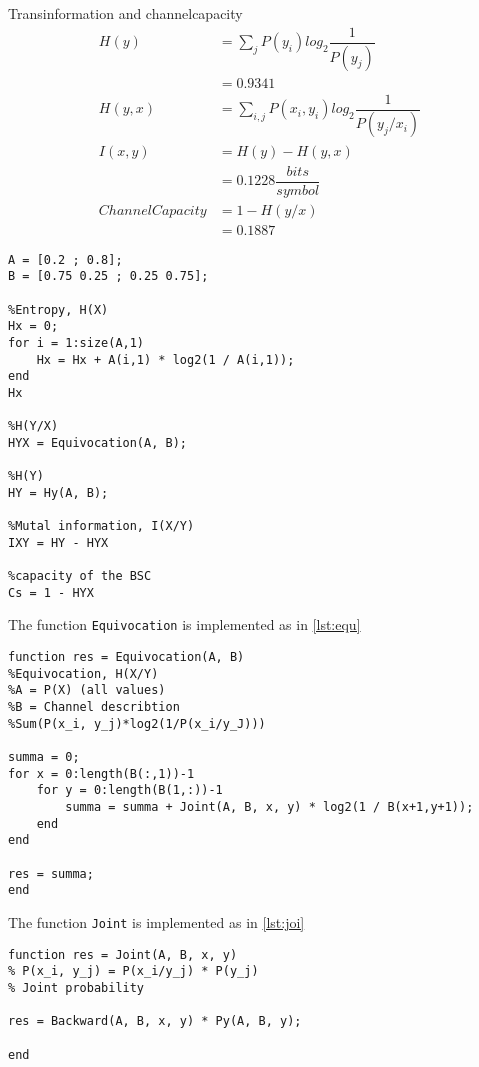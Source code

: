 \documentclass[Main]{subfiles}
\begin{document}
Transinformation and channelcapacity
\begin{align}
H(y) &= \sum_j P(y_i)log_2 \dfrac{1}{P(y_j)}\\
	&= 0.9341\\
H(y,x) &= \sum_{i,j} P(x_i, y_i)log_2\dfrac{1}{P(y_j/x_i)}\\
I(x,y) &= H(y) - H(y,x)\\
	&= 0.1228 \dfrac{bits}{symbol}\\	
ChannelCapacity &= 1- H(y/x)\\
	&= 0.1887
\end{align}


\begin{lstlisting}[caption=Transinformation, style=Code-Matlab, label=lst:trans]
A = [0.2 ; 0.8];
B = [0.75 0.25 ; 0.25 0.75];

%Entropy, H(X)
Hx = 0;
for i = 1:size(A,1)
    Hx = Hx + A(i,1) * log2(1 / A(i,1));
end
Hx

%H(Y/X)
HYX = Equivocation(A, B);

%H(Y)
HY = Hy(A, B);

%Mutal information, I(X/Y)
IXY = HY - HYX

%capacity of the BSC
Cs = 1 - HYX
\end{lstlisting}

The function \texttt{Equivocation} is implemented as in \codeTitle \ref{lst:equ}

\begin{lstlisting}[caption=Equivocation, style=Code-Matlab, label=lst:equ]
function res = Equivocation(A, B)
%Equivocation, H(X/Y)
%A = P(X) (all values)
%B = Channel describtion
%Sum(P(x_i, y_j)*log2(1/P(x_i/y_J)))

summa = 0;
for x = 0:length(B(:,1))-1
    for y = 0:length(B(1,:))-1
        summa = summa + Joint(A, B, x, y) * log2(1 / B(x+1,y+1));
    end
end

res = summa;
end
\end{lstlisting}

The function \texttt{Joint} is implemented as in \codeTitle \ref{lst:joi}

\begin{lstlisting}[caption=Joint, style=Code-Matlab, label=lst:joi]
function res = Joint(A, B, x, y)
% P(x_i, y_j) = P(x_i/y_j) * P(y_j)
% Joint probability

res = Backward(A, B, x, y) * Py(A, B, y);

end
\end{lstlisting}
\end{document}
